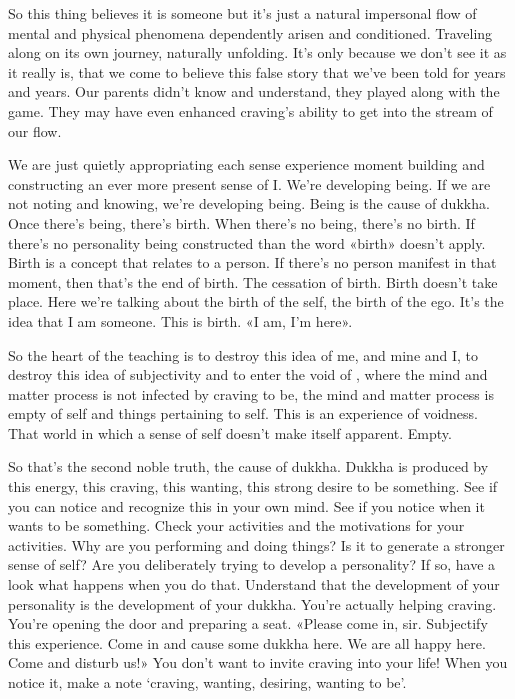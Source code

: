 \documentclass[letterpaper,10pt,english]{sphinxmanual}
\begin{document}
\sphinxAtStartPar
So this thing believes it is someone but it’s just a natural impersonal
flow of mental and physical phenomena dependently arisen and conditioned.
Traveling along on its own journey, naturally unfolding. It’s only because we
don’t see it as it really is, that we come to believe this false story that we’ve
been told for years and years. Our parents didn’t know and understand, they
played along with the game. They may have even enhanced craving’s ability
to get into the stream of our flow.

\sphinxAtStartPar
We are just quietly appropriating each sense experience moment building  and  constructing  an  ever  more  present  sense  of  I.  We’re  developing
being.  If  we  are  not  noting  and  knowing,  we’re  developing  being.  Being
is the cause of dukkha. Once there’s being, there’s birth. When there’s no
being, there’s no birth. If there’s no personality being constructed than the
word  «birth»  doesn’t  apply.  Birth  is  a  concept  that  relates  to  a  person.  If
there’s no person manifest in that moment, then that’s the end of birth. The
cessation  of  birth.  Birth  doesn’t  take  place.  Here  we’re  talking  about  the
birth of the self, the birth of the ego. It’s the idea that I am someone. This is
birth. «I am, I’m here».

\sphinxAtStartPar
So the heart of the teaching is to destroy this idea of me, and mine and
I, to destroy this idea of subjectivity and to enter the void of
, where
the mind and matter process is not infected by craving to be, the mind and
matter process is empty of self and things pertaining to self. This is an experience of voidness. That world in which a sense of self doesn’t make itself
apparent. Empty.

\sphinxAtStartPar
So that’s the second noble truth, the cause of dukkha. Dukkha is produced  by  this  energy,  this  craving,  this  wanting,  this  strong  desire  to  be
something. See if you can notice and recognize this in your own mind. See
if you notice when it wants to be something. Check your activities and the
motivations for your activities. Why are you performing and doing things? Is
it to generate a stronger sense of self? Are you deliberately trying to develop
a personality? If so, have a look what happens when you do that. Understand
that the development of your personality is the development of your dukkha.
You’re  actually  helping  craving. You’re  opening  the  door  and  preparing  a
  seat.  «Please  come  in,  sir.  Subjectify  this  experience.  Come  in  and  cause
some dukkha here. We are all happy here. Come and disturb us!» You don’t
want to invite craving into your life! When you notice it, make a note ‘craving, wanting, desiring, wanting to be’.
\end{document}
